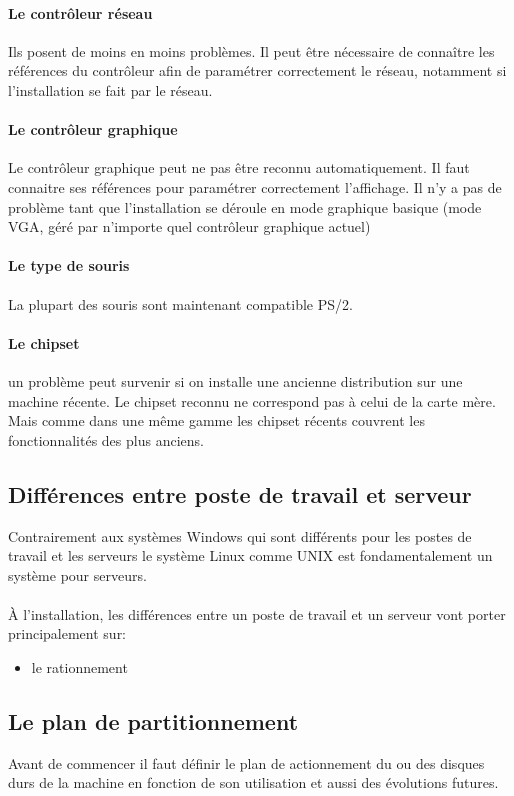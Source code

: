 \documentclass[12pt,a4paper,openany]{book}
\begin{document}
			\paragraph{Le contrôleur réseau}
				Ils posent de moins en moins problèmes. Il peut être nécessaire
				de connaître les références du contrôleur afin de paramétrer correctement
				le réseau, notamment si l'installation se fait par le réseau. 
			\paragraph{Le contrôleur graphique}
				Le contrôleur graphique peut ne pas être reconnu automatiquement.
				Il faut connaitre ses références pour paramétrer correctement 
				l'affichage. Il n'y a pas de problème tant que l'installation se
				déroule en mode graphique basique (mode VGA, géré par n'importe
						quel contrôleur graphique actuel)
			\paragraph{Le type de souris}
				La plupart des souris sont maintenant compatible PS/2.
			\paragraph{Le chipset}
			un problème peut survenir si on installe une ancienne distribution
			sur une machine récente. Le chipset reconnu ne correspond pas à celui
			de la carte mère. Mais comme dans une même gamme les chipset récents 
			couvrent les fonctionnalités des plus anciens.
		\subsection{Différences entre poste de travail et serveur}
			Contrairement aux systèmes Windows qui sont différents pour les postes
			de travail et les serveurs le système Linux comme UNIX est fondamentalement
			un système pour serveurs.\\ \\
			À l'installation, les différences entre un poste de travail et un 
			serveur vont porter principalement sur:
			\begin{itemize}
				\item le rationnement
			\end{itemize}
		\subsection{Le plan de partitionnement}
		Avant de commencer il faut définir le plan de actionnement du ou des disques
		 durs de la machine en fonction de son utilisation et aussi des évolutions futures.
\end{document}
